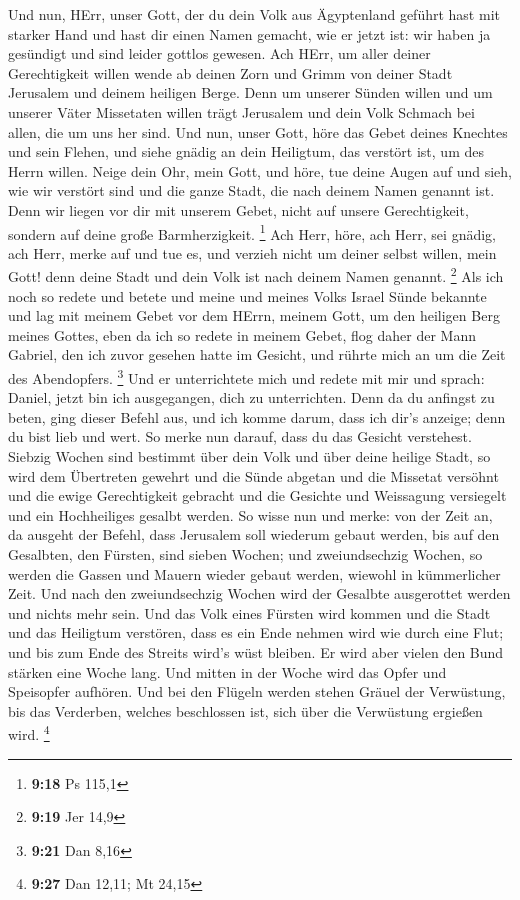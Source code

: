  Und nun, HErr, unser Gott, der du dein Volk aus
Ägyptenland geführt hast mit starker Hand und hast dir einen Namen
gemacht, wie er jetzt ist: wir haben ja gesündigt und sind leider
gottlos gewesen.  Ach HErr, um aller deiner Gerechtigkeit
willen wende ab deinen Zorn und Grimm von deiner Stadt Jerusalem und
deinem heiligen Berge. Denn um unserer Sünden willen und um unserer
Väter Missetaten willen trägt Jerusalem und dein Volk Schmach bei allen,
die um uns her sind.  Und nun, unser Gott, höre das Gebet
deines Knechtes und sein Flehen, und siehe gnädig an dein Heiligtum, das
verstört ist, um des Herrn willen.  Neige dein Ohr, mein
Gott, und höre, tue deine Augen auf und sieh, wie wir verstört sind und
die ganze Stadt, die nach deinem Namen genannt ist. Denn wir liegen vor
dir mit unserem Gebet, nicht auf unsere Gerechtigkeit, sondern auf deine
große Barmherzigkeit. \footnote{\textbf{9:18} Ps 115,1} 
Ach Herr, höre, ach Herr, sei gnädig, ach Herr, merke auf und tue es,
und verzieh nicht um deiner selbst willen, mein Gott! denn deine Stadt
und dein Volk ist nach deinem Namen genannt. \footnote{\textbf{9:19} Jer
  14,9}  Als ich noch so redete und betete und meine und
meines Volks Israel Sünde bekannte und lag mit meinem Gebet vor dem
HErrn, meinem Gott, um den heiligen Berg meines Gottes, 
eben da ich so redete in meinem Gebet, flog daher der Mann Gabriel, den
ich zuvor gesehen hatte im Gesicht, und rührte mich an um die Zeit des
Abendopfers. \footnote{\textbf{9:21} Dan 8,16}  Und er
unterrichtete mich und redete mit mir und sprach: Daniel, jetzt bin ich
ausgegangen, dich zu unterrichten.  Denn da du anfingst zu
beten, ging dieser Befehl aus, und ich komme darum, dass ich dir's
anzeige; denn du bist lieb und wert. So merke nun darauf, dass du das
Gesicht verstehest.  Siebzig Wochen sind bestimmt über dein
Volk und über deine heilige Stadt, so wird dem Übertreten gewehrt und
die Sünde abgetan und die Missetat versöhnt und die ewige Gerechtigkeit
gebracht und die Gesichte und Weissagung versiegelt und ein Hochheiliges
gesalbt werden.  So wisse nun und merke: von der Zeit an,
da ausgeht der Befehl, dass Jerusalem soll wiederum gebaut werden, bis
auf den Gesalbten, den Fürsten, sind sieben Wochen; und zweiundsechzig
Wochen, so werden die Gassen und Mauern wieder gebaut werden, wiewohl in
kümmerlicher Zeit.  Und nach den zweiundsechzig Wochen wird
der Gesalbte ausgerottet werden und nichts mehr sein. Und das Volk eines
Fürsten wird kommen und die Stadt und das Heiligtum verstören, dass es
ein Ende nehmen wird wie durch eine Flut; und bis zum Ende des Streits
wird's wüst bleiben.  Er wird aber vielen den Bund stärken
eine Woche lang. Und mitten in der Woche wird das Opfer und Speisopfer
aufhören. Und bei den Flügeln werden stehen Gräuel der Verwüstung, bis
das Verderben, welches beschlossen ist, sich über die Verwüstung
ergießen wird. \footnote{\textbf{9:27} Dan 12,11; Mt 24,15}

